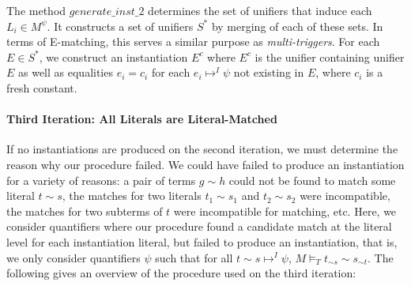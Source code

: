 \documentclass{llncs}
\newtheorem{thm}{Theorem}
\begin{document}
The method $generate\_inst\_2$ determines the set of unifiers that induce each $L_i \in M^\psi$.
It constructs a set of unifiers $S^\ast$ by merging of each of these sets.
In terms of E-matching, this serves a similar purpose as \emph{multi-triggers}.
For each $E \in S^\ast$, we construct an instantiation $E^c$ where $E^c$ is the unifier containing unifier $E$ as well as equalities $e_i = c_i$ for each $e_i \mapsto^I \psi$ not existing in $E$, where $c_i$ is a fresh constant.

\begin{comment}

\begin{thm}
\label{thm:eind-ready}
Given a candidate-satisifiable DPLL(T) state $M \parallel F$, and a formula $\psi$ of the form $\forall \bar{x}. \varphi[ \bar{x} ]$ that is counterexample-active in $M \parallel F$ for $\bar{e}.
For all unifiers $\bar{e} = \bar{s}$ returned by the function $generate\_inst\_2$, we have that $\psi$ is $\bar{e}-\bar{s}$-induced in $M$.
\end{thm}
\begin{proof}
Say $M = M' \cup M^\psi$, where $M^\psi$ are the instantiation literals of $\psi$.
We must show $M', \bar{e} = \bar{s} \models M^\psi$.

\end{proof}

Theorem~\ref{thm:eind-ready} states that if all instantiation literals for $\psi$ are induced by some equality set $E$, then the corresponding instantiation for $E$ is guarenteed to lead to a conflict.
In particular, it can be shown that each unifier $\bar{e} = \bar{s}$ produced by $generate\_inst\_2( M, \psi )$ is such that all literals of $\psi$ are $\bar{e} = \bar{s}$-induced in $M$.
Thus, if any instantiations are returned on this iteration, we are guarenteed to encounter a conflict.
In particular, this means we need only perform \emph{one} such instantiation.
\end{comment}

\paragraph{Third Iteration: All Literals are Literal-Matched}

If no instantiations are produced on the second iteration, we must determine the reason why our procedure failed.
We could have failed to produce an instantiation for a variety of reasons: a pair of terms $g \sim h$ could not be found to match some literal $t \sim s$, the matches for two literals $t_1 \sim s_1$ and $t_2 \sim s_2$ were incompatible, the matches for two subterms of $t$ were incompatible for matching, etc.
Here, we consider quantifiers where our procedure found a candidate match at the literal level for each instantiation literal, but failed to produce an instantiation, that is, we only consider quantifiers $\psi$ such that for all $t \sim s \mapsto^I \psi$, $M \models_T t_{\sim s} \sim s_{\sim t}$.
The following gives an overview of the procedure used on the third iteration:
\end{document}
